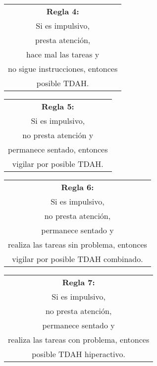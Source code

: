 \documentclass[letterpaper,12pt]{article}
\begin{document}
\begin{center}
\begin{tabular}{|c|}
\hline 
\textbf{Regla 4:} \\
Si es impulsivo, \\
presta atención, \\
hace mal las tareas y  \\
no sigue instrucciones, entonces \\
posible TDAH. \\
\hline 
\end{tabular} 
\end{center}

\begin{center}
	\begin{tabular}{|c|}
		\hline 
		\textbf{Regla 5:} \\
		Si es impulsivo, \\
		no presta atención y\\
		permanece sentado, entonces\\
		vigilar por posible TDAH.\\
		\hline 
	\end{tabular} 
\end{center}

\begin{center}
	\begin{tabular}{|c|}
		\hline 
		\textbf{Regla 6:} \\
		Si es impulsivo, \\
		no presta atención, \\
		permanece sentado y \\
		realiza las tareas sin problema, entonces\\
		vigilar por posible TDAH combinado. \\
		\hline 
	\end{tabular} 
\end{center}

\begin{center}
	\begin{tabular}{|c|}
		\hline 
		\textbf{Regla 7:} \\
		Si es impulsivo, \\
		no presta atención, \\
		permanece sentado y \\
		realiza las tareas con problema, entonces\\
		posible TDAH hiperactivo. \\
		\hline 
	\end{tabular} 
\end{center}
\end{document}
